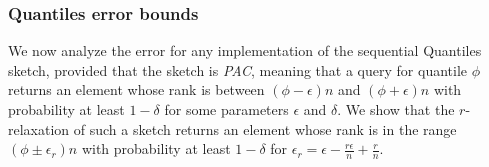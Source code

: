 \subsubsection{Quantiles error bounds}
\label{fc-ssec:quantiles-error-analysis}

We now analyze the error for any implementation of the sequential Quantiles sketch, provided that the sketch is
\emph{PAC}, meaning that a query for quantile $\phi$
returns an element whose rank is between $(\phi-\epsilon)n$ and $(\phi+\epsilon)n$ with 
probability at least $1-\delta$ for some parameters $\epsilon$ and $\delta$. We show that the $r$-relaxation of
such a sketch returns an element whose rank is in the range $(\phi \pm\epsilon_r)n$ with probability at
least $1-\delta$ for $\epsilon_r=\epsilon - \frac{r \epsilon}{n} + \frac{r}{n}$.

